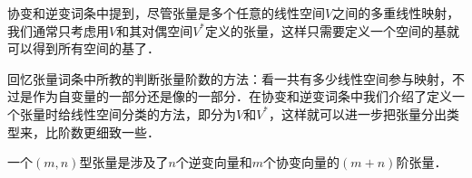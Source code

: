 


协变和逆变词条中提到，尽管张量是多个任意的线性空间$V$之间的多重线性映射，我们通常只考虑用$V$和其对偶空间$V^*$定义的张量，这样只需要定义一个空间的基就可以得到所有空间的基了．

回忆张量词条中所教的判断张量阶数的方法：看一共有多少线性空间参与映射，不过是作为自变量的一部分还是像的一部分．在协变和逆变词条中我们介绍了定义一个张量时给线性空间分类的方法，即分为$V$和$V^*$，这样就可以进一步把张量分出类型来，比阶数更细致一些．

\begin{definition}{}
一个$(m, n)$型张量是涉及了$n$个逆变向量和$m$个协变向量的$(m+n)$阶张量．
\end{definition}





